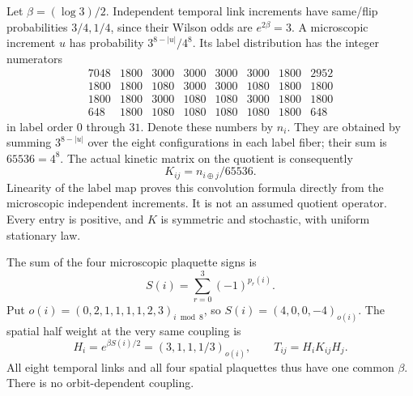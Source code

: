 \documentclass[11pt]{article}
\begin{document}
Let $\beta=(\log3)/2$. Independent temporal link increments have
same/flip probabilities $3/4,1/4$, since their Wilson odds are
$e^{2\beta}=3$. A microscopic increment $u$ has probability
$3^{8-|u|}/4^8$. Its label distribution has the integer numerators
\[
\begin{array}{rrrrrrrr}
7048&1800&3000&3000&3000&3000&1800&2952\\
1800&1800&1080&3000&3000&1080&1800&1800\\
1800&1800&3000&1080&1080&3000&1800&1800\\
648&1800&1080&1080&1080&1080&1800&648
\end{array}
\]
in label order $0$ through $31$. Denote these numbers by $n_i$.
They are obtained by summing $3^{8-|u|}$ over the eight configurations
in each label fiber; their sum is $65536=4^8$. The actual kinetic
matrix on the quotient is consequently
\[
 K_{ij}=n_{i\mathbin\oplus j}/65536.
\]
Linearity of the label map proves this convolution formula directly
from the microscopic independent increments. It is not an assumed
quotient operator. Every entry is positive, and $K$ is symmetric and
stochastic, with uniform stationary law.

The sum of the four microscopic plaquette signs is
\[
 S(i)=\sum_{r=0}^3(-1)^{p_r(i)}.
\]
Put $o(i)=(0,2,1,1,1,1,2,3)_{i\bmod8}$, so
$S(i)=(4,0,0,-4)_{o(i)}$. The spatial half weight at the very same
coupling is
\[
 H_i=e^{\beta S(i)/2}=(3,1,1,1/3)_{o(i)},\qquad
 T_{ij}=H_iK_{ij}H_j.
\]
All eight temporal links and all four spatial plaquettes thus have one
common $\beta$. There is no orbit-dependent coupling.
\end{document}
